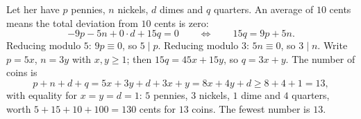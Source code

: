 Let her have $p$ pennies, $n$ nickels, $d$ dimes and $q$ quarters. An average of $10$ cents means the total deviation from $10$ cents is zero:
\[
-9p-5n+0\cdot d+15q=0\qquad\Longleftrightarrow\qquad 15q=9p+5n .
\]
Reducing modulo $5$: $9p\equiv0$, so $5\mid p$. Reducing modulo $3$: $5n\equiv0$, so $3\mid n$. Write $p=5x$, $n=3y$ with $x,y\ge1$; then $15q=45x+15y$, so $q=3x+y$. The number of coins is
\[
p+n+d+q=5x+3y+d+3x+y=8x+4y+d\ge8+4+1=13,
\]
with equality for $x=y=d=1$: $5$ pennies, $3$ nickels, $1$ dime and $4$ quarters, worth $5+15+10+100=130$ cents for $13$ coins. The fewest number is $\boxed{13}$.
